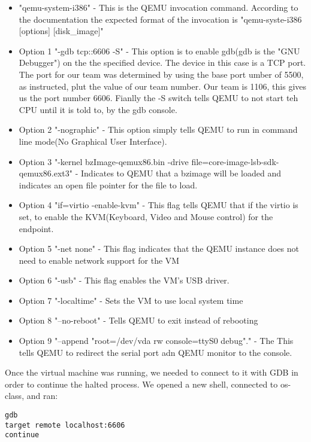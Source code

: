 \documentclass[letterpaper,10pt,draftclsnofoot,onecolumn]{IEEEtran}
\begin{document}
\begin{itemize}
\item "qemu-system-i386" - This is the QEMU invocation command. According to the documentation the expected format of the invocation is "qemu-syste-i386 [options] [disk\_image]" \cite{QEMUDOC1} 
\item Option 1 "-gdb tcp::6606 -S" - This option is to enable gdb(gdb is the "GNU Debugger") on the the specified device. The device in this case is a TCP port. The port for our team was determined by using the base port umber of 5500, as instructed, plut the value of our team number. Our team is 1106, this gives us the port number 6606. Fianlly the -S switch tells QEMU to not start teh CPU until it is told to, by the gdb console. \cite{QEMUDOC1}
\item Option 2 "-nographic" - This option simply tells QEMU to run in command line mode(No Graphical User Interface).\cite{QEMUDOC1}
\item Option 3 "-kernel bzImage-qemux86.bin -drive file=core-image-lsb-sdk-qemux86.ext3" - Indicates to QEMU that a bzimage will be loaded and indicates an open file pointer for the file to load. \cite{QEMUDOC1}
\item Option 4 "if=virtio -enable-kvm" - This flag tells QEMU that if the virtio is set, to enable the KVM(Keyboard, Video and Mouse control) for the endpoint. \cite{QEMUDOC1}
\item Option 5 "-net none" - This flag indicates that the QEMU instance does not need to enable network support for the VM\cite{QEMUDOC1}
\item Option 6 "-usb" - This flag enables the VM's USB driver.\cite{QEMUDOC1}
\item Option 7 "-localtime" - Sets the VM to use local system time\cite{QEMUDOC1}
\item Option 8 "--no-reboot" - Tells QEMU to exit instead of rebooting\cite{QEMUDOC1}
\item Option 9 "--append "root=/dev/vda rw console=ttyS0 debug"." - The This tells QEMU to redirect the serial port adn QEMU monitor to the console.\cite{QEMUDOC1}
\end{itemize}

Once the virtual machine was running, we needed to connect to it with GDB in order to continue the halted process. We opened a new shell, connected to os-class, and ran:
\begin{lstlisting}
gdb
target remote localhost:6606
continue
\end{lstlisting}
\end{document}
